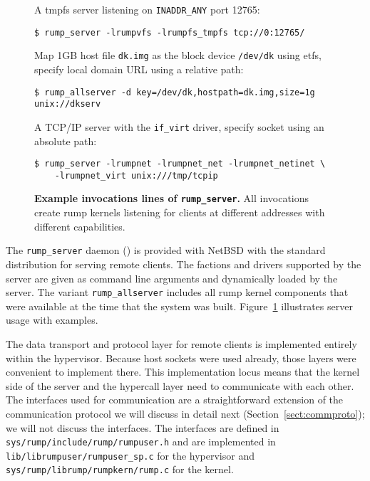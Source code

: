\begin{figure}[t]
\begin{flushleft}
A tmpfs server listening on \verb+INADDR_ANY+ port 12765:
{\small
\begin{verbatim}
$ rump_server -lrumpvfs -lrumpfs_tmpfs tcp://0:12765/
\end{verbatim}}
Map 1GB host file \texttt{dk.img} as the block device \texttt{/dev/dk}
using etfs, specify local domain URL using a relative path:
{\small
\begin{verbatim}
$ rump_allserver -d key=/dev/dk,hostpath=dk.img,size=1g unix://dkserv
\end{verbatim}}
A TCP/IP server with the \verb+if_virt+ driver, specify socket using
an absolute path:
{\small
\begin{verbatim}
$ rump_server -lrumpnet -lrumpnet_net -lrumpnet_netinet \
    -lrumpnet_virt unix:///tmp/tcpip
\end{verbatim}}
\end{flushleft}
\caption[Example invocations lines of \texttt{rump\_server}]{
\textbf{Example invocations lines of \texttt{rump\_server}.}
All invocations create rump kernels listening for clients at different
addresses with different capabilities.
}
\label{fig:rumpserver}
\end{figure}

The \verb+rump_server+ daemon ()
is provided with NetBSD with the standard distribution for serving
remote clients.  The factions and drivers supported by the server
are given as command line arguments and dynamically loaded by the
server.  The variant \verb+rump_allserver+ includes all rump kernel
components that were available at the time that the system was
built.  Figure~\ref{fig:rumpserver} illustrates server usage with
examples.

The data transport and protocol layer for remote clients is
implemented entirely within the hypervisor.  Because host
sockets were used already, those layers were convenient to implement there.
This implementation locus means that the kernel side of the server and the hypercall
layer need to communicate with each other.  The interfaces used for
communication are a straightforward extension of the
communication protocol we will discuss in detail next
(Section~\ref{sect:commproto}); we will not discuss the interfaces.
The interfaces are defined in \texttt{sys/rump/include/rump/rumpuser.h}
and are implemented in \verb+lib/librumpuser/rumpuser_sp.c+ for
the hypervisor and \verb+sys/rump/librump/rumpkern/rump.c+ for the
kernel.

